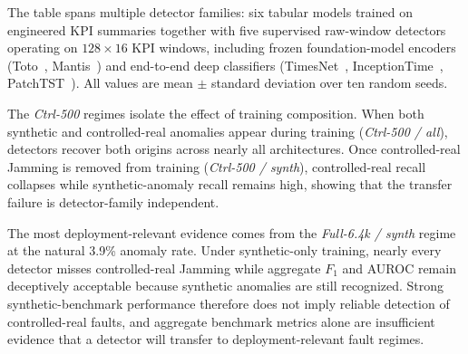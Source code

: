 \documentclass[sigconf,review]{acmart}
\begin{document}
The table spans multiple detector families: six tabular models trained on engineered KPI summaries together with five supervised raw-window detectors operating on $128\times16$ KPI windows, including frozen foundation-model encoders (Toto~\citep{cohen2025toto}, Mantis~\citep{feofanov2025mantis}) and end-to-end deep classifiers (TimesNet~\citep{wu2023timesnet}, InceptionTime~\citep{ismail2020inceptiontime}, PatchTST~\citep{nie2023patchtst}). All values are mean $\pm$ standard deviation over ten random seeds.

The \emph{Ctrl-500} regimes isolate the effect of training composition. When both synthetic and controlled-real anomalies appear during training (\emph{Ctrl-500 / all}), detectors recover both origins across nearly all architectures. Once controlled-real Jamming is removed from training (\emph{Ctrl-500 / synth}), controlled-real recall collapses while synthetic-anomaly recall remains high, showing that the transfer failure is detector-family independent.

The most deployment-relevant evidence comes from the \emph{Full-6.4k / synth} regime at the natural 3.9\% anomaly rate. Under synthetic-only training, nearly every detector misses controlled-real Jamming while aggregate $F_1$ and AUROC remain deceptively acceptable because synthetic anomalies are still recognized. Strong synthetic-benchmark performance therefore does not imply reliable detection of controlled-real faults, and aggregate benchmark metrics alone are insufficient evidence that a detector will transfer to deployment-relevant fault regimes.
\end{document}
